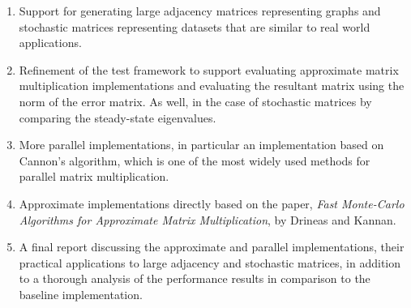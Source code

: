 \documentclass[oneside]{article}
\begin{document}
\begin{enumerate}
\item Support for generating large adjacency matrices representing graphs and stochastic matrices representing datasets that are similar to real world applications.

\item Refinement of the test framework to support evaluating approximate matrix multiplication implementations and evaluating the resultant matrix using the norm of the error matrix. As well, in the case of stochastic matrices by comparing the steady-state eigenvalues.

\item More parallel implementations, in particular an implementation based on Cannon's algorithm, which is one of the most widely used methods for parallel matrix multiplication.

\item Approximate implementations directly based on the paper, \emph{Fast Monte-Carlo Algorithms for Approximate Matrix Multiplication}\cite{drineas2001fast}, by Drineas and Kannan.

\item A final report discussing the approximate and parallel implementations, their practical applications to large adjacency and stochastic matrices, in addition to a thorough analysis of the performance results in comparison to the baseline implementation.

\end{enumerate}



\singlespacing

\end{document}
